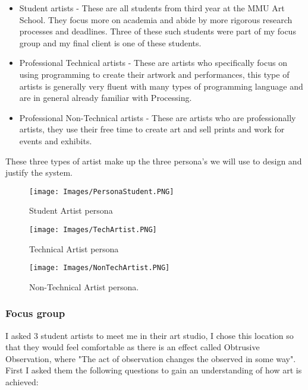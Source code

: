 \documentclass[a4paper]{report}
\begin{document}
\begin{itemize}
\item Student artists - These are all students from third year at the MMU Art School. They focus more on academia and abide by more rigorous research processes and deadlines. Three of these such students were part of my focus group and my final client is one of these students.
\item Professional Technical artists - These are artists who specifically focus on using programming to create their artwork and performances, this type of artists is generally very fluent with many types of programming language and are in general already familiar with Processing\cite{PROCESSING}.
\item Professional Non-Technical artists - These are artists who are professionally artists, they use their free time to create art and sell prints and work for events and exhibits.
\end{itemize}

These three types of artist make up the three persona's we will use to design and justify the system.

\begin{figure}[!ht]
\centering
\texttt{[image: Images/PersonaStudent.PNG]}
\caption{\label{fig:PersonaStudent} Student Artist persona}
\end{figure}

\begin{figure}[!ht]
\centering
\texttt{[image: Images/TechArtist.PNG]}
\caption{\label{fig:TechArtist} Technical Artist persona}
\end{figure}

\begin{figure}[!ht]
\centering
\texttt{[image: Images/NonTechArtist.PNG]}
\caption{\label{fig:NonTechArtist} Non-Technical Artist persona.}
\end{figure}

\clearpage
\subsubsection{Focus group}
I asked 3 student artists to meet me in their art studio, I chose this location so that they would feel comfortable as there is an effect called Obtrusive Observation, where "The act of observation changes the observed in some way"\cite{UX}. First I asked them the following questions to gain an understanding of how art is achieved:
\end{document}
